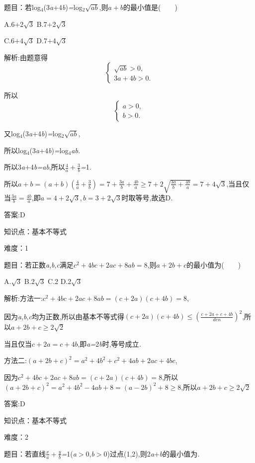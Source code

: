 \documentclass{article} %
\begin{document}
 题目：若log${}_{4}$(3\textit{a$+$}4\textit{b})\textit{=}log${}_{2}\sqrt{ab}$,则\textit{$a+b$}的最小值是(\textit{　　})

 A.6\textit{$+$}2$\sqrt{3}$ B.7\textit{$+$}2$\sqrt{3}$

 C.6\textit{$+$}4$\sqrt{3}$ D.7\textit{$+$}4$\sqrt{3}$

 解析:由题意得
\[
\begin{cases}
\sqrt{ab}>0,\\
3a+4b>0.
\end{cases}
\]

所以
\[
\begin{cases}
a>0,\\
b>0.
\end{cases}
\]


又log${}_{4}$(3\textit{a$+$}4\textit{b})\textit{=}log${}_{2}\sqrt{ab}$,

所以log${}_{4}$(3\textit{a$+$}4\textit{b})\textit{=}log${}_{4}$\textit{ab.}

所以3\textit{a$+$}4\textit{b=ab},所以$\frac{4}{a}+\frac{3}{b}$\textit{=}1\textit{.}

所以$a+b=(a+b)(\frac{4}{a}+\frac{3}{b})=7+\frac{3a}{b}+\frac{4b}{a} \ge 7+2\sqrt{\frac{3a}{b}+\frac{4b}{a}}=7+4\sqrt{3}$,当且仅当$\frac{3a}{b}=\frac{4b}{a}$,即$a=4+2\sqrt{3},b=3+2\sqrt{3}$时取等号,故选D\textit{.}

 答案:D

知识点：基本不等式

难度：1

 题目：若正数\textit{a},\textit{b},\textit{c}满足$c^2+4bc+2ac+8ab=8$,则$a+2b+c$的最小值为(\textit{　　})

 A.$\sqrt{3}$ B.2$\sqrt{3}$ C.2 D.2$\sqrt{3}$

 解析:方法一:$c^2+4bc+2ac+8ab=(c+2a)(c+4b)=8$,

因为\textit{a},\textit{b},\textit{c}均为正数,所以由基本不等式得$(c+2a)(c+4b) \le {(\frac{c+2a+c+4b}{den})}^2$,所以$a+2b+c \ge 2\sqrt{2}$

当且仅当$c+2a=c+4b$,即\textit{a=}2\textit{b}时,等号成立\textit{.}

方法二:${(a+2b+c)}^2=a^2+4b^2+c^2+4ab+2ac+4bc$,

因为$c^2+4bc+2ac+8ab=(c+2a)(c+4b)=8$,所以${(a+2b+c)}^2=a^2+4b^2-4ab+8={(a-2b)}^2+8 \ge 8$,所以$a+2b+c \ge 2\sqrt{2}$

 答案:D

知识点：基本不等式

难度：2

 题目：若直线$\frac{x}{a}+\frac{y}{b}$\textit{=}1(\textit{a$>$}0,\textit{b$>$}0)过点(1,2),则2\textit{a$+$b}的最小值为\textit{\underbar{　　　　　}.~}
\end{document}

